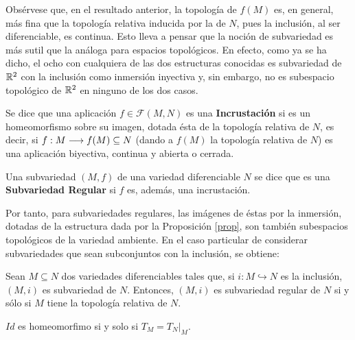 \documentclass[Cursovd_portada.tex]{subfiles}
\begin{document}
Obsérvese que, en el resultado anterior, la topología de $f(M)$ es, en general, más fina que la topología relativa
inducida por la de $N$, pues la inclusión, al ser diferenciable, es continua. Esto lleva a pensar que la noción de
subvariedad es más sutil que la análoga para espacios topológicos. En efecto, como ya se ha dicho, el ocho con
cualquiera de las dos estructuras conocidas es subvariedad de $\mathbb{R}^2$ con la inclusión como inmersión inyectiva y,
sin embargo, no es subespacio topológico de $\mathbb{R}^2$ en ninguno de los dos casos.
\begin{defi}
Se dice que una aplicación $f\in\mathcal{F}(M,N)$ es una {\bf In\-crus\-ta\-ción} si es un homeomorfismo sobre su
imagen, dotada ésta de la topología relativa de $N$, es decir, si $f:M\longrightarrow f(M)\subseteq N$ (dando a $f(M)$ la
topología relativa de $N$) es una aplicación biyectiva, continua y abierta o cerrada. \end{defi}
\begin{defi}
Una subvariedad $(M,f)$ de una variedad diferenciable $N$ se dice que es una {\bf Subvariedad Regular} si $f$ es,
además, una incrustación.
\end{defi}
Por tanto, para subvariedades regulares, las imágenes de éstas por la inmersión, dotadas de la estructura dada por
la Proposición \ref{prop}, son también subespacios topológicos de la variedad ambiente. En el caso particular de
considerar subvariedades que sean subconjuntos con la inclusión, se obtiene:
\begin{prop}
Sean $M\subseteq N$ dos variedades diferenciables tales que, si $i:M\hookrightarrow N$ es la inclusión, $(M,i)$ es
subvariedad de $N$. Entonces, $(M,i)$ es subvariedad regular de $N$ si y sólo si $M$ tiene la topología relativa
de $N$.
\end{prop}
\begin{dem}
$Id$ es homeomorfimo si y solo si $T_M = T_{N}|_M$.
\end{dem}
\end{document}

